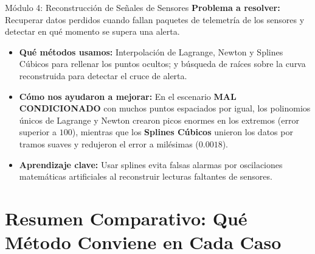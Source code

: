 \documentclass[11pt,a4paper]{article}
\begin{document}
\begin{resumenbox}{Módulo 4: Reconstrucción de Señales de Sensores}
\textbf{Problema a resolver:} Recuperar datos perdidos cuando fallan paquetes de telemetría de los sensores y detectar en qué momento se supera una alerta.
\begin{itemize}[noitemsep]
    \item \textbf{Qué métodos usamos:} Interpolación de Lagrange, Newton y Splines Cúbicos para rellenar los puntos ocultos; y búsqueda de raíces sobre la curva reconstruida para detectar el cruce de alerta.
    \item \textbf{Cómo nos ayudaron a mejorar:} En el escenario \textbf{MAL CONDICIONADO} con muchos puntos espaciados por igual, los polinomios únicos de Lagrange y Newton crearon picos enormes en los extremos (error superior a $100$), mientras que los \textbf{Splines Cúbicos} unieron los datos por tramos suaves y redujeron el error a milésimas ($0.0018$).
    \item \textbf{Aprendizaje clave:} Usar splines evita falsas alarmas por oscilaciones matemáticas artificiales al reconstruir lecturas faltantes de sensores.
\end{itemize}
\end{resumenbox}

\section{Resumen Comparativo: Qué Método Conviene en Cada Caso}

\begin{table}[h!]
\centering
\caption{Resumen práctico de utilidad y mejora obtenida con los métodos numéricos.}
\end{table}
\end{document}
